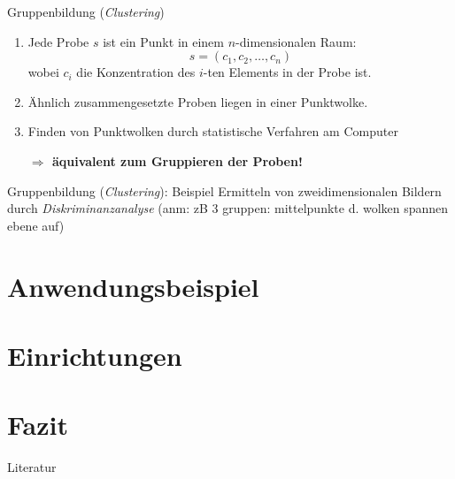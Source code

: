 \documentclass[xcolor=dvipsnames, aspectratio=169]{beamer}
\begin{document}
\begin{frame}[<+->]{Gruppenbildung (\emph{Clustering})}
\begin{enumerate}[(1)]
\item Jede Probe $s$ ist ein \alert{Punkt} in einem $n$-dimensionalen Raum: \[s=(c_1,c_2,\dots,c_n)\] wobei $c_i$ die Konzentration des $i$-ten Elements in der Probe ist.
\item Ähnlich zusammengesetzte Proben liegen in einer \alert{Punktwolke}.
\item Finden von Punktwolken durch statistische Verfahren am Computer

\textbf{$\Rightarrow$ äquivalent zum Gruppieren der Proben!}
\end{enumerate}
\end{frame}

\begin{frame}[<+->]{Gruppenbildung (\emph{Clustering}): Beispiel}
Ermitteln von zweidimensionalen Bildern durch \emph{Diskriminanzanalyse} (anm: zB 3 gruppen: mittelpunkte d. wolken spannen ebene auf)
\end{frame}

\section{Anwendungsbeispiel}

\section{Einrichtungen}

\section{Fazit}
\begin{frame}[allowframebreaks]{Literatur}
\nocite{*}

\printbibliography[heading=none]
\end{frame}

\maketitle
\end{document}
